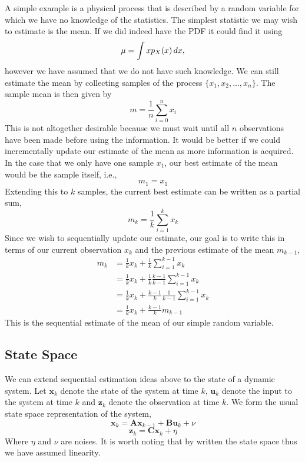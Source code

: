 \documentclass[11pt]{article}
\begin{document}
A simple example is a physical process that is described by a random variable
for which we have no knowledge of the statistics. The simplest statistic we may
wish to estimate is the mean. If we did indeed have the PDF it could find it
using
\begin{equation} \label{eq:someequation}
\mu = \int{xp_{X}(x)\textrm\,{d}x},
\end{equation}
however we have assumed that we do not have such knowledge. We can still
estimate the mean by collecting samples of the process $\{x_{1}, x_{2}, ... ,
x_{n}\}$. The sample mean is then given by
\begin{equation}
m = \frac{1}{n}\sum\limits_{i = 0}^{n}{x_{i}}
\end{equation}
This is not altogether desirable because we must wait until all $n$ observations
have been made before using the information. It would be better if we could
incrementally update our estimate of the mean as more information is acquired.
In the case that we only have one sample $x_{1}$, our best estimate of the mean
would be the sample itself, i.e.,
\begin{equation*}
m_{1} = x_{1}
\end{equation*}
Extending this to $k$ samples, the current best estimate can be written as a
partial sum,
\begin{equation}
m_{k} = \frac{1}{k}\sum\limits_{i = 1}^k{x_{k}}
\end{equation}
Since we wish to sequentially update our estimate, our goal is to write this
in terms of our current observation $x_{k}$ and the previous estimate of the
mean $m_{k-1}$,
\begin{align*}
m_{k} &= \frac{1}{k}x_{k} + \frac{1}{k}\sum\limits_{i = 1}^{k-1}{x_{k}} \\
&= \frac{1}{k}x_{k} + \frac{1}{k}\frac{k-1}{k-1}\sum\limits_{i=1}^{k-1}{x_{k}}
\\
&= \frac{1}{k}x_{k} + \frac{k-1}{k}\frac{1}{k-1}\sum\limits_{i=1}^{k-1}{x_{k}}
\\
&= \frac{1}{k}x_{k} + \frac{k-1}{k}m_{k-1}
\end{align*}
This is the sequential estimate of the mean of our simple random variable.

\subsection{State Space}
We can extend sequential estimation ideas above to the state of a dynamic
system. Let $\mathbf{x}_{k}$ denote the state of the system at time $k$,
$\mathbf{u}_{k}$ denote the input to the system at time $k$ and
$\mathbf{z}_{k}$ denote the observation at time $k$. We form the usual state
space representation of the system,
\begin{equation}
\mathbf{x}_{k} = \mathbf{A}\mathbf{x}_{k-1} + \mathbf{B}\mathbf{u}_{k} + \nu
\end{equation}
\begin{equation}
\mathbf{z}_{k} = \mathbf{C}\mathbf{x}_{k} + \eta
\end{equation}
Where $\eta$ and $\nu$ are noises. It is worth noting that by written the state
space thus we have assumed linearity.
\end{document}
